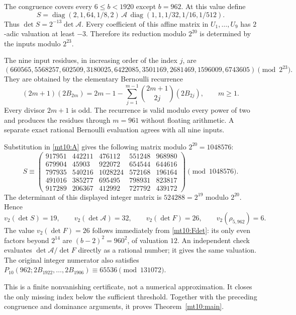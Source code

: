 The congruence covers every $6\le b<1920$ except $b=962$.
At this value define
\[
 S=\operatorname{diag}(2,1,64,1/8,2)\,
 \mathcal A\,\operatorname{diag}(1,1,1/32,1/16,1/512).
\]
Thus $\det S=2^{-13}\det\mathcal A$.
Every coefficient of this affine matrix in $U_1,\ldots,U_9$ has
$2$-adic valuation at least $-3$. Therefore its reduction modulo
$2^{20}$ is determined by the inputs modulo $2^{23}$.

The nine input residues, in increasing order of the index $j$, are
\[
 (660565,5568257,602509,3180025,6422085,3501169,
                         2681469,1596009,6743605)\pmod {2^{23}}.
\]
They are obtained by the elementary Bernoulli recurrence
\begin{equation}\label{mt10:Bernoulli-recurrence}
 (2m+1)(2B_{2m})
   =2m-1-\sum_{j=1}^{m-1}\binom{2m+1}{2j}(2B_{2j}),\qquad m\ge1.
\end{equation}
Every divisor $2m+1$ is odd. The recurrence is valid modulo every
power of two and produces the residues through $m=961$ without
floating arithmetic. A separate exact rational Bernoulli evaluation
agrees with all nine inputs.

Substitution in \eqref{mt10:A} gives the following matrix modulo
$2^{20}=1048576$:
\[
 S\equiv
 \begin{pmatrix}
 917951&442211&476112&551248&968980\\
 679904&45903&922072&654544&644616\\
 797935&540216&1028224&572168&196164\\
 491016&385277&695495&798931&823817\\
 917289&206367&412992&727792&439172
 \end{pmatrix}\pmod {1048576}.
\]
The determinant of this displayed integer matrix is
$524288=2^{19}$ modulo $2^{20}$. Hence
\[
 v_2(\det S)=19,\qquad
 v_2(\det\mathcal A)=32,\qquad
 v_2(\det F)=26,\qquad v_2(\rho_{5,962})=6.
\]
The value $v_2(\det F)=26$ follows immediately from
\eqref{mt10:Fdet}: its only even factors beyond $2^{14}$ are
$(b-2)^2=960^2$, of valuation $12$.
An independent check evaluates $\det\mathcal A/\det F$ directly
as a rational number; it gives the same valuation. The original
integer numerator also satisfies
$P_{10}(962;2B_{1922},\ldots,2B_{1906})\equiv65536\pmod {131072}$.

This is a finite nonvanishing certificate, not a numerical
approximation. It closes the only missing index below the sufficient
threshold. Together with the preceding congruence and dominance
arguments, it proves Theorem~\ref{mt10:main}.

